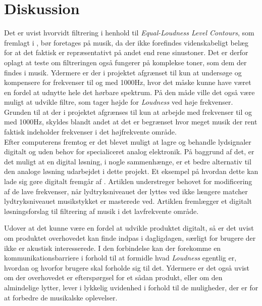 \chapter{Diskussion}
\label{Diskussion}
%
Det er uvist hvorvidt filtrering i henhold til \textit{Equal-Loudness Level Contours}, som fremlagt i , bør foretages på musik, da der ikke forefindes videnskabeligt belæg for at det faktisk er repræsentativt på andet end rene sinustoner. Det er derfor oplagt at teste om filtreringen også fungerer på komplekse toner, som dem der findes i musik. Ydermere er der i projektet afgrænset til kun at undersøge og kompensere for frekvenser til og med 1000Hz, hvor det måske kunne have været en fordel at udnytte hele det hørbare spektrum. På den måde ville det også være muligt at udvikle filtre, som tager højde for \textit{Loudness} ved høje frekvenser. Grunden til at der i projektet afgrænses til kun at arbejde med frekvenser til og med 1000Hz, skyldes blandt andet at det er begrænset hvor meget musik der rent faktisk indeholder frekvenser i det højfrekvente område. \\[5mm]
%
Efter computerens fremtog er det blevet muligt at lagre og behandle lydsignaler digitalt og uden behov for specialiceret analog elektronik. På baggrund af det, er det muligt at en digital løsning, i nogle sammenhænge, er et bedre alternativ til den analoge løsning udarbejdet i dette projekt. Et eksempel på hvordan dette kan lade sig gøre digitalt fremgår af \textcite{PDF:Sofus}. Artiklen understreger behovet for modificering af de lave frekvenser, når lydtryksniveauet der lyttes ved ikke længere matcher lydtryksniveauet musikstykket er masterede ved. Artiklen fremlægger et digitalt løsningsforslag til filtrering af musik i det lavfrekvente område.

Udover at det kunne være en fordel at udvikle produktet digitalt, så er det uvist om produktet overhovedet kan finde indpas i dagligdagen, særligt for brugere der ikke er akustisk interesserede. I den forbindelse kan der forekomme en kommunikationsbarriere i forhold til at formidle hvad \textit{Loudness} egentlig er, hvordan og hvorfor brugere skal forholde sig til det. Ydermere er det også uvist om der overhovedet er efterspørgsel for et sådan produkt, eller om den almindelige lytter, lever i lykkelig uvidenhed i forhold til de muligheder, der er for at forbedre de musikalske oplevelser.   

